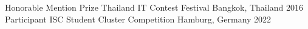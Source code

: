 


\begin{cvhonors}

  \cvhonor
    {Honorable Mention Prize} %
    {Thailand IT Contest Festival} %
    {Bangkok, Thailand} %
    {2016} %
  \cvhonor
    {Participant}
    {ISC Student Cluster Competition}
    {Hamburg, Germany}
    {2022}
\end{cvhonors}
